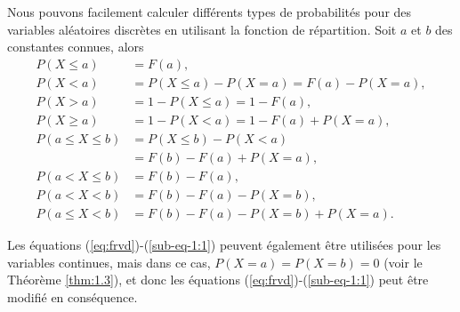 Nous pouvons facilement calculer différents types de probabilités pour des variables aléatoires discrètes en utilisant
la fonction de répartition. Soit $ a $ et $ b $ des constantes connues, alors
\begin{align}\label{eq:freqs}
P(X\leq a) & = F(a),\label{sub-eq-1:8}\\P(X<a) &= P(X\leq a)-P(X=a)=F(a)-P(X=a),\\P(X>a) &= 1-P(X\leq a)=1-F(a),\\
P(X\geq a) &=1-P(X<a)=1-F(a)+P(X=a),\\ \nonumber P(a\leq X\leq b) &= P(X\leq b) - P(X<a)\\ &=F(b)-F(a)+P(X=a),\\
P(a<X\leq b) &= F(b)-F(a),\\P(a<X<b) &= F(b)-F(a)-P(X=b),\label{sub-eq-1:14}\\P(a\leq X<b)&=F(b)-F(a)-P(X=b)+P(X=a).\label{sub-eq-1:1}
\end{align}
\begin{remark}
Les équations (\ref{eq:frvd})-(\ref{sub-eq-1:1}) peuvent également être utilisées pour les variables continues, mais dans ce cas,
$P (X = a) = P (X = b) = 0$ (voir le Théorème \ref{thm:1.3}), et donc les équations (\ref{eq:frvd})-(\ref{sub-eq-1:1}) peut être modifié en conséquence.
\end{remark}

